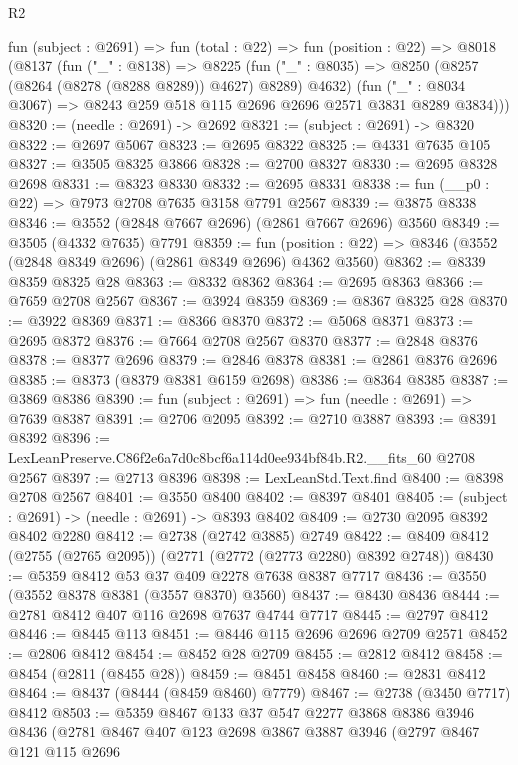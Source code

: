 \begin{lexlean}{R2}
\begin{coremodule}
  fun (subject : @2691) =>
  fun (total : @22) =>
  fun (position : @22) =>
  @8018
    (@8137
      (fun ("_" : @8138) =>
      @8225
        (fun ("_" : @8035) => @8250 (@8257 (@8264 (@8278 (@8288 @8289)) @4627) @8289) @4632)
        (fun ("_" : @8034 @3067) => @8243 @259 @518 @115 @2696 @2696 @2571 @3831 @8289 @3834)))
@8320 := (needle : @2691) -> @2692
@8321 := (subject : @2691) -> @8320
@8322 := @2697 @5067
@8323 := @2695 @8322
@8325 := @4331 @7635 @105
@8327 := @3505 @8325 @3866
@8328 := @2700 @8327
@8330 := @2695 @8328 @2698
@8331 := @8323 @8330
@8332 := @2695 @8331
@8338 := fun (__p0 : @22) => @7973 @2708 @7635 @3158 @7791 @2567
@8339 := @3875 @8338
@8346 := @3552 (@2848 @7667 @2696) (@2861 @7667 @2696) @3560
@8349 := @3505 (@4332 @7635) @7791
@8359 := fun (position : @22) => @8346 (@3552 (@2848 @8349 @2696) (@2861 @8349 @2696) @4362 @3560)
@8362 := @8339 @8359 @8325 @28
@8363 := @8332 @8362
@8364 := @2695 @8363
@8366 := @7659 @2708 @2567
@8367 := @3924 @8359
@8369 := @8367 @8325 @28
@8370 := @3922 @8369
@8371 := @8366 @8370
@8372 := @5068 @8371
@8373 := @2695 @8372
@8376 := @7664 @2708 @2567 @8370
@8377 := @2848 @8376
@8378 := @8377 @2696
@8379 := @2846 @8378
@8381 := @2861 @8376 @2696
@8385 := @8373 (@8379 @8381 @6159 @2698)
@8386 := @8364 @8385
@8387 := @3869 @8386
@8390 := fun (subject : @2691) => fun (needle : @2691) => @7639 @8387
@8391 := @2706 @2095
@8392 := @2710 @3887
@8393 := @8391 @8392
@8396 := LexLeanPreserve.C86f2e6a7d0c8bcf6a114d0ee934bf84b.R2.__fits_60 @2708 @2567
@8397 := @2713 @8396
@8398 := LexLeanStd.Text.find
@8400 := @8398 @2708 @2567
@8401 := @3550 @8400
@8402 := @8397 @8401
@8405 := (subject : @2691) -> (needle : @2691) -> @8393 @8402
@8409 := @2730 @2095 @8392 @8402 @2280
@8412 := @2738 (@2742 @3885) @2749
@8422 := @8409 @8412 (@2755 (@2765 @2095)) (@2771 (@2772 (@2773 @2280) @8392 @2748))
@8430 := @5359 @8412 @53 @37 @409 @2278 @7638 @8387 @7717
@8436 := @3550 (@3552 @8378 @8381 (@3557 @8370) @3560)
@8437 := @8430 @8436
@8444 := @2781 @8412 @407 @116 @2698 @7637 @4744 @7717
@8445 := @2797 @8412
@8446 := @8445 @113
@8451 := @8446 @115 @2696 @2696 @2709 @2571
@8452 := @2806 @8412
@8454 := @8452 @28 @2709
@8455 := @2812 @8412
@8458 := @8454 (@2811 (@8455 @28))
@8459 := @8451 @8458
@8460 := @2831 @8412
@8464 := @8437 (@8444 (@8459 @8460) @7779)
@8467 := @2738 (@3450 @7717) @8412
@8503 := @5359
    @8467
    @133
    @37
    @547
    @2277
    @3868
    @8386
    @3946
    @8436
    (@2781
      @8467
      @407
      @123
      @2698
      @3867
      @3887
      @3946
      (@2797
        @8467
        @121
        @115
        @2696

\end{coremodule}
\end{lexlean}
